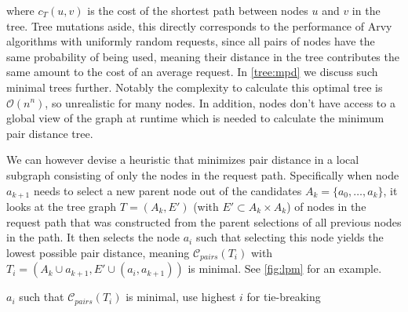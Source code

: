 \documentclass[a4paper, oneside]{discothesis}
\begin{document}
where $c_T(u,v)$ is the cost of the shortest path between nodes $u$ and $v$ in the tree. Tree mutations aside, this directly corresponds to the performance of Arvy algorithms with uniformly random requests, since all pairs of nodes have the same probability of being used, meaning their distance in the tree contributes the same amount to the cost of an average request. In \autoref{tree:mpd} we discuss such minimal trees further. Notably the complexity to calculate this optimal tree is $\mathcal{O}(n^n)$, so unrealistic for many nodes. In addition, nodes don't have access to a global view of the graph at runtime which is needed to calculate the minimum pair distance tree.

We can however devise a heuristic that minimizes pair distance in a local subgraph consisting of only the nodes in the request path. Specifically when node $a_{k+1}$ needs to select a new parent node out of the candidates $A_k=\{a_{0},\dots,a_{k}\}$, it looks at the tree graph $T=(A_k,E')$ (with $E'\subset A_k\times A_k$) of nodes in the request path that was constructed from the parent selections of all previous nodes in the path. It then selects the node $a_{i}$ such that selecting this node yields the lowest possible pair distance, meaning $\mathcal{C}_{pairs}(T_i)$ with $T_i=(A_k\cup a_{k+1},E'\cup(a_{i},a_{k+1}))$ is minimal. See \autoref{fig:lpm} for an example.

\begin{algorithmic}
\State\Return$a_{i}$ such that $\mathcal{C}_{pairs}(T_i)$ is minimal, use highest $i$ for tie-breaking
\EndFunction
\end{algorithmic}
\end{document}

